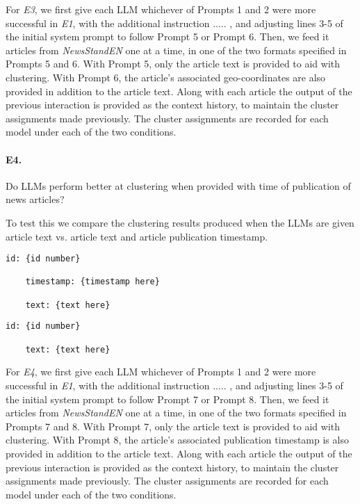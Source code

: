 
For \emph{E3}, we first give each LLM whichever of Prompts 1 and 2 were more successful in \emph{E1}, with the additional instruction ..... , and adjusting lines 3-5 of the initial system prompt to follow Prompt 5 or Prompt 6.
Then, we feed it articles from \emph{NewsStandEN} one at a time, in one of the two formats specified in Prompts 5 and 6. 
With Prompt 5, only the article text is provided to aid with clustering.
With Prompt 6, the article's associated geo-coordinates are also provided in addition to the article text.
Along with each article the output of the previous interaction is provided as the context history, to maintain the cluster assignments made previously.
The cluster assignments are recorded for each model under each of the two conditions.

\paragraph{\textbf{E4.}}
Do LLMs perform better at clustering when provided with time of publication of news articles? 

\noindent To test this we compare the clustering results produced when the LLMs are given article text vs. article text and article publication timestamp. 

\begin{lstlisting}[title=Prompt 7: Timestamp Prompt]
    id: {id number}
    
    timestamp: {timestamp here}

    text: {text here}
\end{lstlisting}
\begin{lstlisting}[title=Prompt 8: No Timestamp Prompt]
    id: {id number}

    text: {text here}
\end{lstlisting}

For \emph{E4}, we first give each LLM whichever of Prompts 1 and 2 were more successful in \emph{E1}, with the additional instruction ..... , and adjusting lines 3-5 of the initial system prompt to follow Prompt 7 or Prompt 8.
Then, we feed it articles from \emph{NewsStandEN} one at a time, in one of the two formats specified in Prompts 7 and 8. 
With Prompt 7, only the article text is provided to aid with clustering.
With Prompt 8, the article's associated publication timestamp is also provided in addition to the article text.
Along with each article the output of the previous interaction is provided as the context history, to maintain the cluster assignments made previously.
The cluster assignments are recorded for each model under each of the two conditions.






